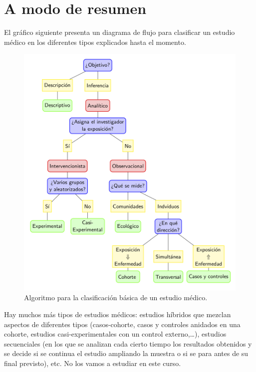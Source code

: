\documentclass[
]{book}
\theoremstyle{definition}
\theoremstyle{definition}
\theoremstyle{definition}
\theoremstyle{definition}
\theoremstyle{remark}
\begin{document}
\hypertarget{a-modo-de-resumen}{%
\section{A modo de resumen}\label{a-modo-de-resumen}}

El gráfico siguiente presenta un diagrama de flujo para clasificar un estudio médico en los diferentes tipos explicados hasta el momento.

\begin{figure}

{\centering \includegraphics[width=0.9\linewidth]{INREMDN_files/figure-html/estructura} 

}

\caption{Algoritmo para la clasificación básica de un estudio médico.}\label{fig:algoritmo}
\end{figure}

Hay muchos más tipos de estudios médicos: estudios híbridos que mezclan aspectos de diferentes tipos (casos-cohorte, casos y controles anidados en una cohorte, estudios casi-experimentales con un control externo,\ldots), estudios secuenciales (en los que se analizan cada cierto tiempo los resultados obtenidos y se decide si se continua el estudio ampliando la muestra o si se para antes de su final previsto), etc. No los vamos a estudiar en este curso.
\end{document}
